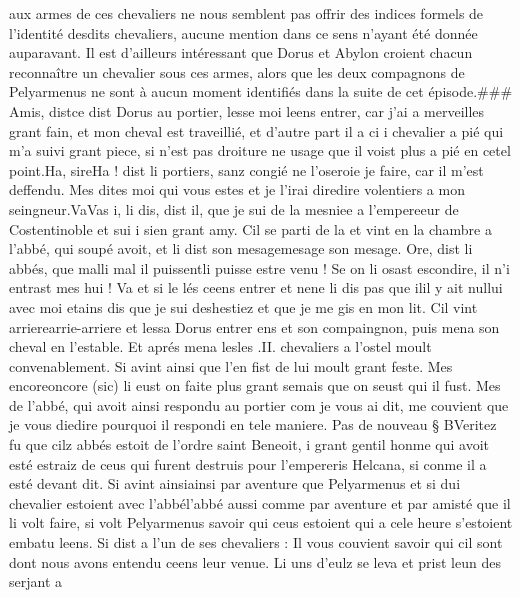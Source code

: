 \documentclass{article}
\begin{document}
\begin{pages}
      aux armes de ces chevaliers ne nous semblent pas offrir des indices formels de l'identité desdits chevaliers, aucune mention
      dans ce sens n'ayant été donnée auparavant. Il est d'ailleurs intéressant que Dorus et Abylon croient chacun reconnaître un 
      chevalier sous ces armes, alors que les deux compagnons de Pelyarmenus ne sont à aucun moment identifiés dans la suite de cet 
      épisode.### \pend
\pstart Amis, 
   distce dist Dorus au 
   portier, 
   lesse moi leens entrer, car j’ai a merveilles grant fain, et mon cheval est traveillié, et d’autre part il a ci i chevalier 
   a pié qui m’a suivi grant piece, si n’est pas droiture ne usage que il voist plus a pié en 
   cetel point.Ha, sireHa ! dist 
      li portiers, sanz congié ne l’oseroie 
      je faire, car il m’est deffendu. Mes dites moi qui vous estes et je l’irai 
      diredire volentiers a mon seingneur.VaVas i, 
      li dis, dist il, que je sui de la mesniee a 
      l’empereeur de Costentinoble 
   et sui i sien grant amy.
   Cil se parti de la et vint en la chambre a l’abbé, qui soupé avoit, et li dist son 
   mesagemesage son mesage.
   Ore, dist li abbés, que 
      malli mal 
      il puissentli puisse estre venu ! Se on li osast escondire, 
      il n’i entrast mes hui ! Va et si le lés ceens entrer et nene li 
      dis pas que ilil y ait nullui avec moi 
      etains dis que je sui deshestiez et que je me gis en mon lit.
   Cil vint arrierearrie-arriere 
      et 
   lessa Dorus entrer ens et 
   son compaingnon, puis mena son cheval en l’estable. Et aprés mena 
   lesles .II. chevaliers a l’ostel moult convenablement. Si avint ainsi que 
   l’en fist de lui moult grant feste. Mes encoreoncore (sic) li eust 
   on faite plus grant 
   semais que on seust qui il fust. Mes de 
   l’abbé, qui avoit ainsi respondu au portier 
   com je vous ai dit, 
      me couvient que je vous diedire pourquoi il respondi en tele maniere. \pend
\pstart Pas de nouveau § BVeritez fu que 
   cilz abbés estoit de l’ordre saint Beneoit, 
   i grant gentil honme qui avoit esté estraiz de ceus qui furent destruis pour l’empereris 
   Helcana, si conme il a esté devant dit. Si avint 
   ainsiainsi par aventure que 
   Pelyarmenus et si dui chevalier estoient avec 
   l’abbél'abbé aussi comme par aventure
   et par amisté que il li volt faire, si volt Pelyarmenus savoir qui ceus estoient 
   qui a cele heure s’estoient embatu leens. Si dist a l’un de ses chevaliers :
   Il vous couvient savoir qui cil sont dont nous avons entendu ceens leur venue.
   Li uns d’eulz se leva et prist leun des serjant a 

\end{pages}
\end{document}

